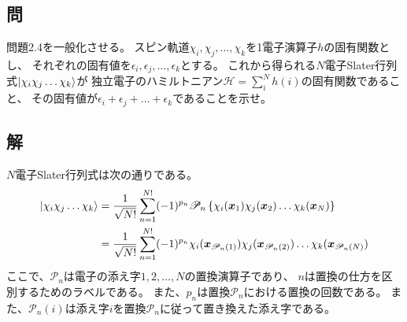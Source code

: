 \subsection{問}
問題2.4を一般化させる。
スピン軌道$\chi_i,\chi_j,\dots,\chi_k$を1電子演算子$h$の固有関数とし、
それぞれの固有値を$\epsilon_i,\epsilon_j,\dots,\epsilon_k$とする。
これから得られる$N$電子Slater行列式$\ket{\chi_i\chi_j \dots\chi_k}$が
独立電子のハミルトニアン$\mathscr{H}=\sum_i^N h(i)$の固有関数であること、
その固有値が$\epsilon_i+\epsilon_j+\dots+\epsilon_k$であることを示せ。


\subsection{解}
$N$電子Slater行列式は次の通りである。
\begin{align}
	\ket{\chi_i\chi_j\dots\chi_k}
&=
	\frac{1}{\sqrt{N!}}
	\sum_{n=1}^{N!}
		(-1)^{p_n}
		\mathscr{P}_n\left\{
			\chi_i(\x_1) \chi_j(\x_2) \dots \chi_k(\x_N)
		\right\} \\
%
%
&=
	\frac{1}{\sqrt{N!}}
	\sum_{n=1}^{N!}
		(-1)^{p_n}
		\chi_i(\x_{\mathscr{P}_n(1)})
		\chi_j(\x_{\mathscr{P}_n(2)})
		\dots
		\chi_k(\x_{\mathscr{P}_n(N)})
\end{align}
ここで、$\mathscr{P}_n$は電子の添え字$1,2,\dots,N$の置換演算子であり、
$n$は置換の仕方を区別するためのラベルである。
また、$p_n$は置換$\mathscr{P}_n$における置換の回数である。
また、$\mathscr{P}_n(i)$は添え字$i$を置換$\mathscr{P}_n$に従って置き換えた添え字である。

